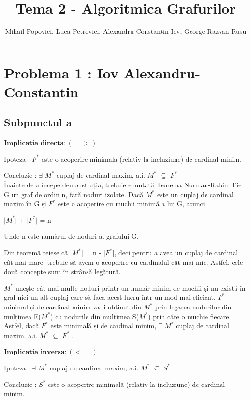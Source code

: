 \documentclass{article}
\title{Tema 2 - Algoritmica Grafurilor}
\author{Mihail Popovici, Luca Petrovici, Alexandru-Constantin Iov, George-Razvan Rusu}
\begin{document}
\maketitle

\section*{\fontsize{20}{50}\selectfont Problema 1 : Iov Alexandru-Constantin}
\subsection*{\fontsize{16}{30}\selectfont Subpunctul a}
{\fontsize{14}{16}\selectfont 
$\mathbf{Implicatia}$ $\mathbf{directa: (=>)}$ 
\\
\par Ipoteza : $F^*$ este o acoperire minimala (relativ la incluziune) de cardinal minim.
\par Concluzie : $\exists$ $M^*$ cuplaj de cardinal maxim, a.i. $M^*$ $\subseteq$ $F^*$ 
\\

Înainte de a începe demonstrația, trebuie enunțată Teorema Norman-Rabin: Fie G un graf de ordin n, fară noduri izolate. Dacă $M^*$ este un cuplaj de cardinal maxim în G și $F^*$ este o acoperire cu muchii minimă a lui G, atunci:
\par \centerline{$\vert$$M^*$$\vert$ + $\vert$$F^*$$\vert$ = n}
Unde n este numărul de noduri al grafului G.

Din teoremă reiese că $\vert$$M^*$$\vert$ = n - $\vert$$F^*$$\vert$, deci pentru a avea un cuplaj de cardinal cât mai mare, trebuie să avem o acoperire cu cardinalul cât mai mic. Astfel, cele două concepte sunt în strânsă legătură.


\par $M^*$ unește cât mai multe noduri printr-un număr minim de muchii și nu există în graf nici un alt cuplaj care să facă acest lucru într-un mod mai eficient. $F^*$ minimal și de cardinal minim va fi obținut din $M^*$ prin legarea nodurilor din mulțimea E($M^*$) cu nodurile din mulțimea S($M^*$) prin câte o muchie fiecare. Astfel, dacă $F^*$ este minimală și de cardinal minim, $\exists$ $M^*$ cuplaj de cardinal maxim, a.i. $M^*$ $\subseteq$ $F^*$ . 
\par
$\mathbf{Implicatia}$ $\mathbf{inversa: (<=)}$ 
\\
\par Ipoteza : $\exists$ $M^*$ cuplaj de cardinal maxim, a.i. $M^*$ $\subseteq$ $S^*$ 
\par Concluzie : $S^*$ este o acoperire minimală (relativ la incluziune) de cardinal minim.      
\\

}
\end{document}
